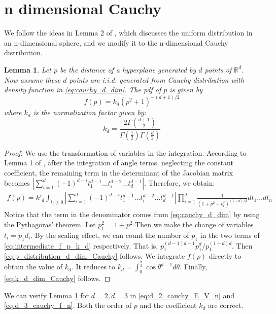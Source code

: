 \documentclass{article}
\newtheorem{lemma}{Lemma}
\def\R{\mathbb{R}}
\begin{document}
\section{n dimensional Cauchy}
We follow the ideas in Lemma 2 of \cite{raynaud1970enveloppe},
which discusses the uniform distribution in an n-dimensional sphere,
and we modify it to the n-dimensional Cauchy distribution.
\begin{lemma}\label{lem:p_distribution_d_dim_Cauchy}
    Let $p$ be the distance of a hyperplane generated by $d$ points of $\R^d$.
    Now assume these $d$ points are i.i.d. generated from Cauchy distribution with density
    function in \eqref{eq:cauchy_d_dim}.
    The pdf of $p$ is given by
    \begin{equation}\label{eq:p_distribution_d_dim_Cauchy}
        f(p) = k_d (p^2+1)^{-(d+1)/2}
    \end{equation}
    where $k_d$ is the normalization factor given by:
    \begin{equation}\label{eq:k_d_dim_Cauchy}
        k_d = \frac{2 \Gamma \left(\frac{d+1}{2} \right)}{
            \Gamma(\frac{1}{2})
            \Gamma(\frac{d}{2})
        }
    \end{equation}
\end{lemma}
\begin{proof}
    We use the transformation of variables in the integration.
    According to Lemma 1 of  \cite{raynaud1970enveloppe},
    after the integration of angle terms, neglecting the constant coefficient,
    the remaining term in the determinant of the Jacobian matrix becomes
    $|\sum_{i=1}^d (-1)^{d-i} t^{d-1}_1 \dots 
    t^{d-2}_i \dots t^{d-1}_d|$.
    Therefore, we obtain:
    \begin{align}\label{eq:intermediate_f_p_k_d}
        f(p) = k'_d \int_{t_i\geq 0}|\sum_{i=1}^d (-1)^{d-i} t^{d-1}_1 \dots 
        t^{d-2}_i \dots t^{d-1}_d|
        \prod_{i=1}^d \frac{1}{(1+p^2+t_i^2)^{(1+d)/2}}dt_1 \dots dt_n
    \end{align}
    Notice that the term in the denominator
    comes from \eqref{eq:cauchy_d_dim} by using
    the Pythagoras' theorem.
    Let $p_1^2=1+p^2$
    Then we make the change of variables $t_i = p_1d_i$.
    By the scaling effect, we can count the number of $p_1$
    in the two terms of \eqref{eq:intermediate_f_p_k_d}
    respectively. That is, $p_1^{(d-1)d-1}p_1^d / p_1^{(1+d)d}$.
    Then \eqref{eq:p_distribution_d_dim_Cauchy} follows.
    We integrate $f(p)$ directly to obtain the value of $k_d$.
    It reduces to $k_d=\int_0^{\frac{\pi}{2}} \cos\theta^{d-1} d\theta$.
    Finally, \eqref{eq:k_d_dim_Cauchy} follows.
\end{proof}
We can verify Lemma \ref{lem:p_distribution_d_dim_Cauchy}
for $d=2,d=3$ in \eqref{eq:d_2_cauchy_E_V_n} and \eqref{eq:d_3_cauchy_f_n}.
Both the order of $p$ and the coefficient $k_d$ are correct.
\end{document}

